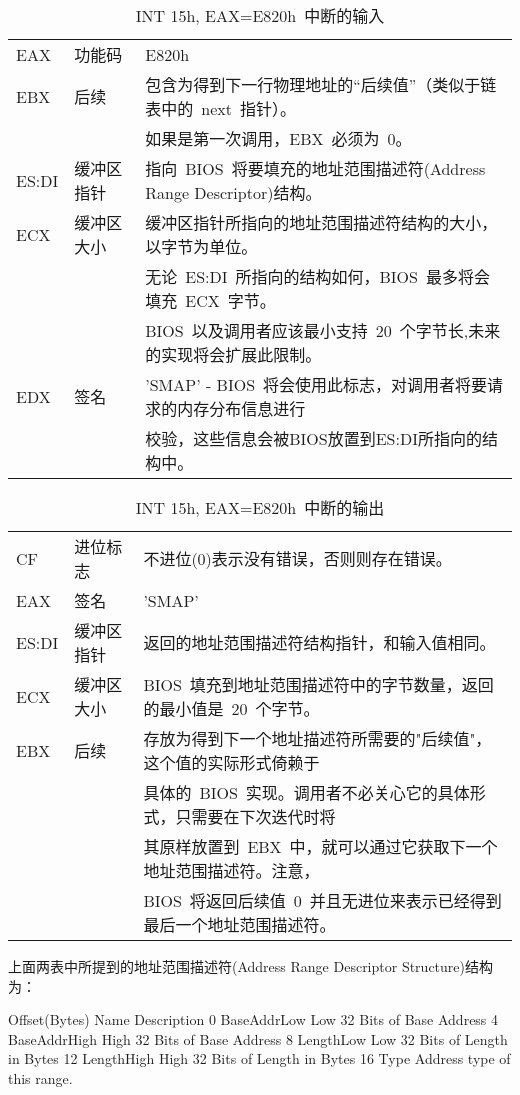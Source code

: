 \begin{center}\begin{longtable}{lll}
\caption[]{INT 15h, EAX=E820h~中断的输入}\label{e820_input}\\
\hline
EAX & 功能码 & E820h\\
EBX & 后续   & 包含为得到下一行物理地址的“后续值”（类似于链表中的~next~指针）。\\
& & 如果是第一次调用，EBX~必须为~0。\\
ES:DI & 缓冲区指针 & 指向~BIOS~将要填充的地址范围描述符(Address Range Descriptor)结构。\\
ECX & 缓冲区大小 & 缓冲区指针所指向的地址范围描述符结构的大小，以字节为单位。\\
& & 无论~ES:DI~所指向的结构如何，BIOS~最多将会填充~ECX~字节。\\
& & BIOS~以及调用者应该最小支持~20~个字节长,未来的实现将会扩展此限制。\\
EDX & 签名 & 'SMAP' - BIOS~将会使用此标志，对调用者将要请求的内存分布信息进行\\
& & 校验，这些信息会被BIOS放置到ES:DI所指向的结构中。\\
\hline
\end{longtable}\end{center}

\begin{center}\begin{longtable}{lll}
\caption[]{INT 15h, EAX=E820h~中断的输出}\label{e820_output}\\
\hline
CF & 进位标志 & 不进位(0)表示没有错误，否则则存在错误。\\
EAX & 签名   & 'SMAP'\\
ES:DI & 缓冲区指针 & 返回的地址范围描述符结构指针，和输入值相同。\\
ECX & 缓冲区大小 & BIOS~填充到地址范围描述符中的字节数量，返回的最小值是~20~个字节。\\
EBX & 后续 & 存放为得到下一个地址描述符所需要的"后续值"，这个值的实际形式倚赖于\\
& & 具体的~BIOS~实现。调用者不必关心它的具体形式，只需要在下次迭代时将\\
& & 其原样放置到~EBX~中，就可以通过它获取下一个地址范围描述符。注意，\\
& & BIOS~将返回后续值~0~并且无进位来表示已经得到最后一个地址范围描述符。\\
\hline
\end{longtable}\end{center}

上面两表中所提到的地址范围描述符(Address Range Descriptor Structure)结构为：
\begin{Command}
Offset(Bytes)     Name        Description
      0       BaseAddrLow     Low 32 Bits of Base Address
      4       BaseAddrHigh    High 32 Bits of Base Address
      8       LengthLow       Low 32 Bits of Length in Bytes
     12       LengthHigh      High 32 Bits of Length in Bytes
     16       Type            Address type of  this range.
\end{Command}

